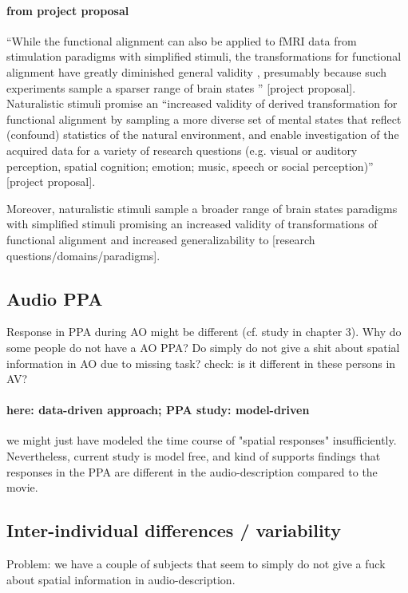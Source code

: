 \paragraph{from project proposal}
%
``While the functional alignment can also be applied to fMRI data from
stimulation paradigms with simplified stimuli, the transformations for
functional alignment have greatly diminished general validity
\citep{haxby2011common}, presumably because such experiments sample a sparser
range of brain states \citep{guntupalli2016model}'' [project proposal].
%
Naturalistic stimuli promise an ``increased validity of derived transformation
for functional alignment by sampling a more diverse set of mental states that
reflect (confound) statistics of the natural environment, and enable
investigation of the acquired data for a variety of research questions (e.g.
visual or auditory perception, spatial cognition; emotion; music, speech or
social perception)'' [project proposal].

%
Moreover, naturalistic stimuli sample a broader range of brain states paradigms
with simplified stimuli \citep{guntupalli2016model, haxby2011common} promising
an increased validity of transformations of functional alignment and increased
generalizability to [research questions/domains/paradigms].



\subsection{Audio PPA}

%
Response in PPA during AO might be different (cf. study in chapter 3).
%
Why do some people do not have a AO PPA? Do simply do not give a shit
about spatial information in AO due to missing task?
%
check: is it different in these persons in AV?


\paragraph{here: data-driven approach; PPA study: model-driven}
%
we might just have modeled the time course of "spatial responses"
insufficiently.
%
Nevertheless, current study is model free, and kind of supports findings that
responses in the PPA are different in the audio-description compared to the
movie.


\subsection{Inter-individual differences / variability}
%
Problem: we have a couple of subjects that seem to simply do not give a fuck
about spatial information in audio-description.


